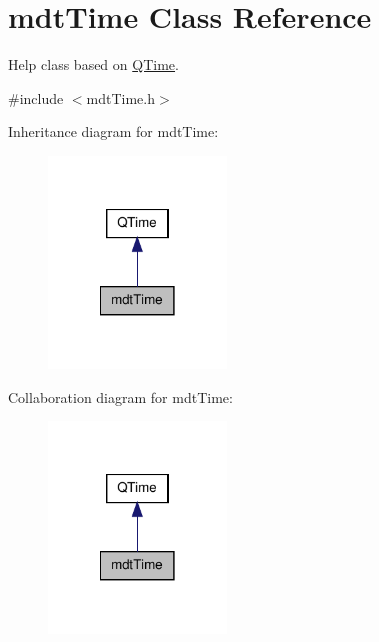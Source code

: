 \hypertarget{classmdt_time}{\section{mdt\-Time Class Reference}
\label{classmdt_time}
}


Help class based on \hyperlink{class_q_time}{Q\-Time}.  




{\ttfamily \#include $<$mdt\-Time.\-h$>$}



Inheritance diagram for mdt\-Time\-:\nopagebreak
\begin{figure}[H]
\begin{center}
\leavevmode
\includegraphics[width=134pt]{classmdt_time__inherit__graph}
\end{center}
\end{figure}


Collaboration diagram for mdt\-Time\-:\nopagebreak
\begin{figure}[H]
\begin{center}
\leavevmode
\includegraphics[width=134pt]{classmdt_time__coll__graph}
\end{center}
\end{figure}
